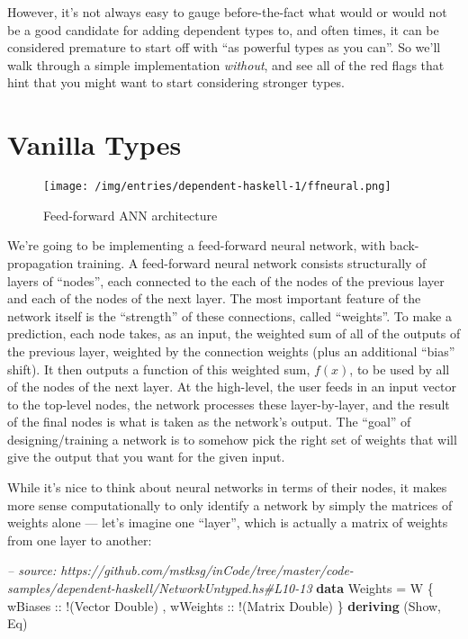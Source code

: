 \documentclass[]{article}
\newenvironment{Shaded}{}{}
\newcommand{\KeywordTok}[1]{\textcolor[rgb]{0.00,0.44,0.13}{\textbf{{#1}}}}
\newcommand{\DataTypeTok}[1]{\textcolor[rgb]{0.56,0.13,0.00}{{#1}}}
\newcommand{\CommentTok}[1]{\textcolor[rgb]{0.38,0.63,0.69}{\textit{{#1}}}}
\newcommand{\OtherTok}[1]{\textcolor[rgb]{0.00,0.44,0.13}{{#1}}}
\newcommand{\FunctionTok}[1]{\textcolor[rgb]{0.02,0.16,0.49}{{#1}}}
\newcommand{\NormalTok}[1]{{#1}}
\begin{document}
However, it's not always easy to gauge before-the-fact what would or
would not be a good candidate for adding dependent types to, and often
times, it can be considered premature to start off with ``as powerful
types as you can''. So we'll walk through a simple implementation
\emph{without}, and see all of the red flags that hint that you might
want to start considering stronger types.

\section{Vanilla Types}\label{vanilla-types}

\begin{figure}[htbp]
\centering
\texttt{[image: /img/entries/dependent-haskell-1/ffneural.png]}
\caption{Feed-forward ANN architecture}
\end{figure}

We're going to be implementing a feed-forward neural network, with
back-propagation training. A feed-forward neural network consists
structurally of layers of ``nodes'', each connected to the each of the
nodes of the previous layer and each of the nodes of the next layer. The
most important feature of the network itself is the ``strength'' of
these connections, called ``weights''. To make a prediction, each node
takes, as an input, the weighted sum of all of the outputs of the
previous layer, weighted by the connection weights (plus an additional
``bias'' shift). It then outputs a function of this weighted sum,
\(f(x)\), to be used by all of the nodes of the next layer. At the
high-level, the user feeds in an input vector to the top-level nodes,
the network processes these layer-by-layer, and the result of the final
nodes is what is taken as the network's output. The ``goal'' of
designing/training a network is to somehow pick the right set of weights
that will give the output that you want for the given input.

While it's nice to think about neural networks in terms of their nodes,
it makes more sense computationally to only identify a network by simply
the matrices of weights alone --- let's imagine one ``layer'', which is
actually a matrix of weights from one layer to another:

\begin{Shaded}
\begin{Highlighting}[]
\CommentTok{-- source: https://github.com/mstksg/inCode/tree/master/code-samples/dependent-haskell/NetworkUntyped.hs#L10-13}
\KeywordTok{data} \DataTypeTok{Weights} \FunctionTok{=} \DataTypeTok{W} \NormalTok{\{}\OtherTok{ wBiases  ::} \FunctionTok{!}\NormalTok{(}\DataTypeTok{Vector} \DataTypeTok{Double}\NormalTok{)}
                 \NormalTok{,}\OtherTok{ wWeights ::} \FunctionTok{!}\NormalTok{(}\DataTypeTok{Matrix} \DataTypeTok{Double}\NormalTok{)}
                 \NormalTok{\}}
  \KeywordTok{deriving} \NormalTok{(}\DataTypeTok{Show}\NormalTok{, }\DataTypeTok{Eq}\NormalTok{)}
\end{Highlighting}
\end{Shaded}
\end{document}
